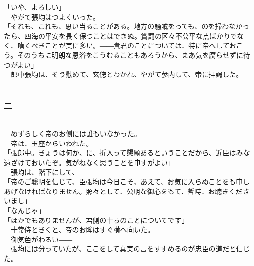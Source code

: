 \documentclass[
  paper=a5,
  fontsize=10pt,
  jafontsize=9.5pt,
  tate,                  %
  open_bracket_pos=nibu, %
]{jlreq}
\begin{document}
「いや、よろしい」\\


　やがて張均はつよくいった。\\


「それも、これも、思い当ることがある。地方の騒賊をっても、のを掃わなかったら、四海の平安を長く保つことはできぬ。賞罰の区々不公平な点ばかりでなく、嘆くべきことが実に多い。――貴君のことについては、特に帝へしておこう。そのうちに明朗な恩浴をこうむることもあろうから、まあ気を腐らせずに待つがよい」\\


　郎中張均は、そう慰めて、玄徳とわかれ、やがて参内して、帝に拝謁した。\\

\\

\subsubsection{二}

\\


　めずらしく帝のお側には誰もいなかった。\\


　帝は、玉座からいわれた。\\


「張郎中。きょうは何か、に、折入って懇願あるということだから、近臣はみな遠ざけておいたぞ。気がねなく思うことを申すがよい」\\


　張均は、階下にして、\\


「帝のご聡明を信じて、臣張均は今日こそ、あえて、お気に入らぬことをも申しあげなければなりません。照々として、公明な御心をもて、暫時、お聴きくださいまし」\\


「なんじゃ」\\


「ほかでもありませんが、君側の十らのことについてです」\\


　十常侍ときくと、帝のお眸はすぐ横へ向いた。\\


　御気色がわるい――\\


　張均には分っていたが、ここをして真実の言をすすめるのが忠臣の道だと信じた。\\
\end{document}
